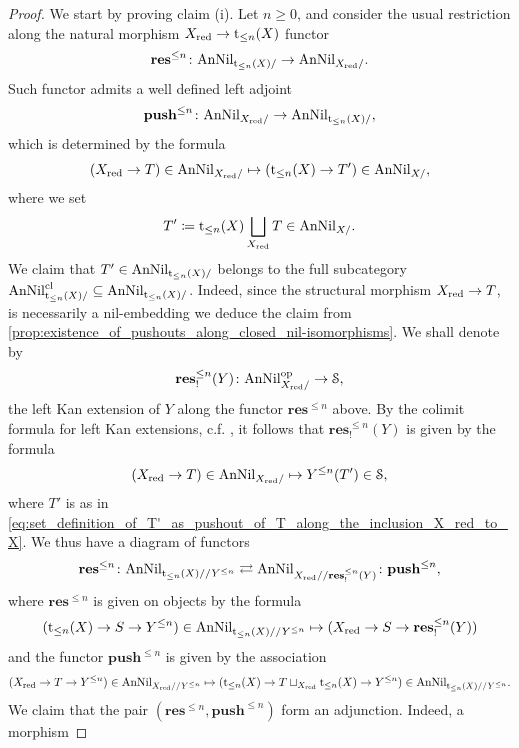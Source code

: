 \documentclass[10pt,a4paper,reqno]{amsart} %
\theoremstyle{plain}
\theoremstyle{definition}
\theoremstyle{remark}
\numberwithin{equation}{section}
\begin{document}
\begin{proof}
    We start by proving claim (i). Let $n \ge 0$, and consider the usual restriction along the natural morphism $X_{\mathrm{red}} \to \mathrm t_{\le n}(X)$ functor 
        \[\mathbf{res}^{\le n} \colon \mathrm{AnNil}_{\mathrm t_{\le n}(X)/} \to \mathrm{AnNil}_{X_{\mathrm{red}}/}.\]
    Such functor admits a well defined left adjoint
        \[\mathbf{push}^{\le n} \colon \mathrm{AnNil}_{X_{\mathrm{red}}/} \to \mathrm{AnNil}_{\mathrm t_{\le n}(X)/},\]
    which is determined by the formula
        \[
            (X_{\mathrm{red}} \to T) \in \mathrm{AnNil}_{X_{\mathrm{red}} /} \mapsto (\mathrm t_{\le n}(X) \to T') \in \mathrm{AnNil}_{X/},   
        \]
    where we set
        \begin{equation} \label{eq:set_definition_of_T'_as_pushout_of_T_along_the_inclusion_X_red_to_X}
            T' \coloneqq \mathrm t_{\le n}(X) \bigsqcup_{X_{\mathrm{red}}} T \in \mathrm{AnNil}_{X/}.  
        \end{equation}
    We claim that $T' \in \mathrm{AnNil}_{\mathrm t_{\le n}(X)/}$ belongs to the full subcategory $\mathrm{AnNil}^{\mathrm{cl}}_{\mathrm t_{\le n}(X)/} \subseteq \mathrm{AnNil}_{\mathrm t_{\le n}(X)/}$.
    Indeed, since the structural morphism
        $X_{\mathrm{red}} \to T$,
    is necessarily a nil-embedding we deduce the claim from \cref{prop:existence_of_pushouts_along_closed_nil-isomorphisms}.
    We shall denote by
        \[
            \mathbf{res}^{\le n}_!(Y) \colon \mathrm{AnNil}^\mathrm{op}_{X_{\mathrm{red}} /} \to \mathcal S,
        \]
    the left Kan extension of $Y$ along the functor $\mathbf{res}^{\le n}$ above. By the colimit formula
    for left Kan extensions, c.f. \cite[Lemma 4.3.2.13]{HTT}, it follows that $\mathbf{res}^{\le n}_!(Y)$ is given by the formula
        \[
            (X_{\mathrm{red}} \to T) \in  \mathrm{AnNil}_{X_{\mathrm{red}} /} \mapsto Y^{\le n}(T') \in \mathcal S,
        \]
    where $T'$ is as in \eqref{eq:set_definition_of_T'_as_pushout_of_T_along_the_inclusion_X_red_to_X}. 
    We thus have a diagram of functors
        \[
            \mathbf{res}^{\le n} \colon \mathrm{AnNil}_{\mathrm t_{\le n}(X)/ /Y^{\le n}} \rightleftarrows \mathrm{AnNil}_{X_{\mathrm{red}} // \mathbf{res}^{\le n}_!(Y)} \colon \mathbf{push}^{\le n},
        \]
    where $\mathbf{res}^{\le n}$ is given on objects by the formula
        \[
            (\mathrm t_{\le n}(X) \to S \to Y^{\le n}) \in \mathrm{AnNil}_{\mathrm t_{\le n}(X)/ /Y^{\le n}} \mapsto (X_{\mathrm{red}} \to S \to \mathbf{res}_!^{\le n}(Y) ) 
        \]
    and the functor $\mathbf{push}^{\le n}$ is given by the association
        \[
            (X_{\mathrm{red}} \to T \to Y^{\le n}) \in \mathrm{AnNil}_{X_{\mathrm{red}}/ /Y^{\le n}} \mapsto (\mathrm t_{\le n}(X) \to T \sqcup_{X_{\mathrm{red}}} \mathrm t_{\le n}(X) \to Y^{\le n}) \in \mathrm{AnNil}_{\mathrm t_{\le n}(X)/ /Y^{\le n}}.  
        \]
    We claim that the pair $(\mathbf{res}^{\le n}, \mathbf{push}^{\le n})$ form an adjunction. Indeed, a morphism

\end{proof}
\end{document}

